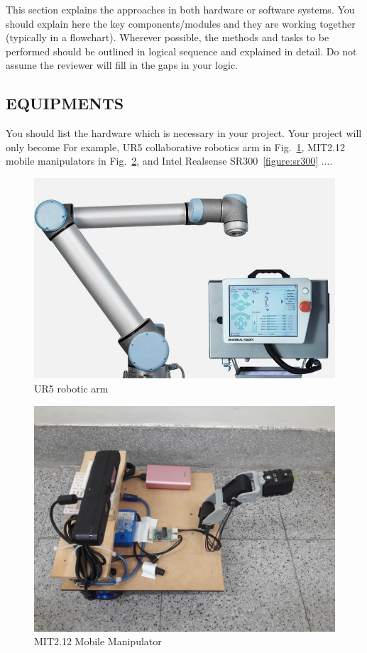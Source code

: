 \documentclass[letterpaper, 10 pt, conference]{ieeeconf}  %
\begin{document}
This section explains the approaches in both hardware or software systems. You should explain here the key components/modules and they are working together (typically in a flowchart). Wherever possible, the methods and tasks to be performed should be outlined in logical sequence and explained in detail. Do not assume the reviewer will fill in the gaps in your logic. 

\subsection{EQUIPMENTS} 

You should list the hardware which is necessary in your project. Your project will only become For example, UR5 collaborative robotics arm in Fig.~\ref{figure:ur5}, MIT2.12 mobile manipulators in Fig.~\ref{figure:mit212mm}, and Intel Realsense SR300~\ref{figure:sr300} ....

\begin{figure}[!b]
\includegraphics[width=0.7\columnwidth]{UR5}
\centering
\caption{UR5 robotic arm}
 \label{figure:ur5}
\end{figure}

\begin{figure}[h]
\includegraphics[width=0.7\columnwidth]{robot}
\centering
\caption{MIT2.12 Mobile Manipulator}
 \label{figure:mit212mm}
\end{figure}
\end{document}
